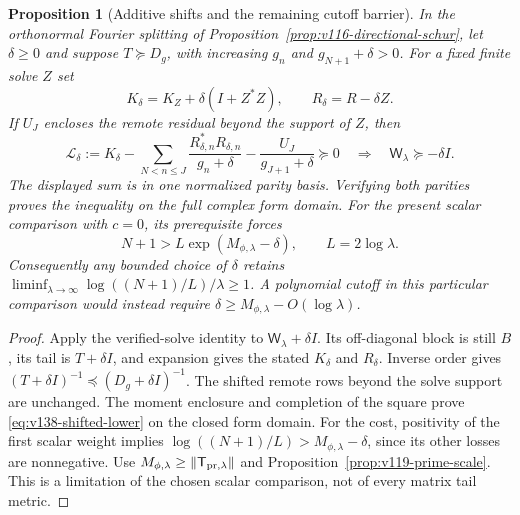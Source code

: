 \documentclass[11pt]{article}
\newtheorem{proposition}[theorem]{Proposition}
\theoremstyle{remark}
\begin{document}
\begin{proposition}[Additive shifts and the remaining cutoff barrier]
\label{prop:v138-shifted-floor}
In the orthonormal Fourier splitting of
Proposition~\ref{prop:v116-directional-schur}, let $\delta\ge0$ and
suppose $T\succeq D_g$, with increasing $g_n$ and
$g_{N+1}+\delta>0$. For a fixed finite solve $Z$ set
\[
 K_\delta=K_Z+\delta(I+Z^*Z),\qquad
 R_\delta=R-\delta Z.
\]
If $U_J$ encloses the remote residual beyond the support of $Z$, then
\begin{equation}\label{eq:v138-shifted-lower}
 \mathcal L_\delta:=K_\delta-
 \sum_{N<n\le J}\frac{R_{\delta,n}^*R_{\delta,n}}{g_n+\delta}
 -\frac{U_J}{g_{J+1}+\delta}\succeq0
 \quad\Longrightarrow\quad
 \mathsf W_\lambda\succeq-\delta I.
\end{equation}
The displayed sum is in one normalized parity basis. Verifying both
parities proves the inequality on the full complex form domain.
For the present scalar comparison with $c=0$, its prerequisite forces
\begin{equation}\label{eq:v138-shifted-cost}
 N+1>L\exp(M_{\phi,\lambda}-\delta),\qquad L=2\log\lambda.
\end{equation}
Consequently any bounded choice of $\delta$ retains
$\liminf_{\lambda\to\infty}\log((N+1)/L)/\lambda\ge1$.
A polynomial cutoff in this particular comparison would instead
require $\delta\ge M_{\phi,\lambda}-O(\log\lambda)$.
\end{proposition}
\begin{proof}
Apply the verified-solve identity to $\mathsf W_\lambda+\delta I$.
Its off-diagonal block is still $B$, its tail is $T+\delta I$, and
expansion gives the stated $K_\delta$ and $R_\delta$. Inverse order
gives $(T+\delta I)^{-1}\preceq(D_g+\delta I)^{-1}$.
The shifted remote rows beyond the solve support are unchanged.
The moment enclosure and completion of the square prove
\eqref{eq:v138-shifted-lower} on the closed form domain.
For the cost, positivity of the first scalar weight implies
$\log((N+1)/L)>M_{\phi,\lambda}-\delta$, since its other losses
are nonnegative. Use
$M_{\phi,\lambda}\ge\|\mathsf T_{{\rm pr},\lambda}\|$ and
Proposition~\ref{prop:v119-prime-scale}. This is a limitation of
the chosen scalar comparison, not of every matrix tail metric.
\end{proof}
\end{document}
